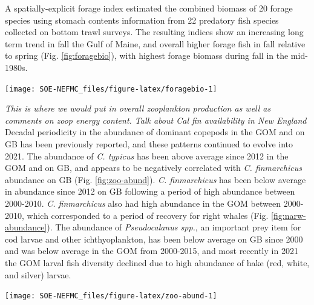 \documentclass[
  10pt,
]{article}
\let\origfigure\figure
\let\endorigfigure\endfigure
\renewenvironment{figure}[1][2] {
    \expandafter\origfigure\expandafter[H]
} {
    \endorigfigure
}
\begin{document}
A spatially-explicit forage index estimated the combined biomass of 20 forage species using stomach contents information from 22 predatory fish species collected on bottom trawl surveys. The resulting indices show an increasing long term trend in fall the Gulf of Maine, and overall higher forage fish in fall relative to spring (Fig. \ref{fig:foragebio}), with highest forage biomass during fall in the mid-1980s.\\

\begin{figure}

{\centering \texttt{[image: SOE-NEFMC\_files/figure-latex/foragebio-1]} 

}

\caption{Forage fish index based on spring and fall survey predator diets.}\label{fig:foragebio}
\end{figure}

\emph{This is where we would put in overall zooplankton production as well as comments on zoop energy content. Talk about Cal fin availability in New England}
Decadal periodicity in the abundance of dominant copepods in the GOM and on GB has been previously reported, and these patterns continued to evolve into 2021. The abundance of \emph{C. typicus} has been above average since 2012 in the GOM and on GB, and appears to be negatively correlated with \emph{C. finmarchicus} abundance on GB (Fig. \ref{fig:zoo-abund}). \emph{C. finmarchicus} has been below average in abundance since 2012 on GB following a period of high abundance between 2000-2010. \emph{C. finmarchicus} also had high abundance in the GOM between 2000-2010, which corresponded to a period of recovery for right whales (Fig. \ref{fig:narw-abundance}). The abundance of \emph{Pseudocalanus spp.}, an important prey item for cod larvae and other ichthyoplankton, has been below average on GB since 2000 and was below average in the GOM from 2000-2015, and most recently in 2021 the GOM larval fish diversity declined due to high abundance of hake (red, white, and silver) larvae.

\begin{figure}

{\centering \texttt{[image: SOE-NEFMC\_files/figure-latex/zoo-abund-1]} 

}

\caption{Abundance Annomalies of three dominante zooplankton (\textit{Calanus finmarchicus}, \textit{Calanus typicus}, and \textit{Pseudocalanus spp}.) on Georges Bank (GB) and the Gulf of Maine (GOM).}\label{fig:zoo-abund}
\end{figure}
\end{document}
